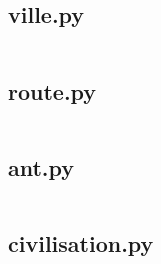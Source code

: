 \documentclass{rapportECL}
\begin{document}
\subsection{ville.py}

\inputminted{python}{scr/ville.py}

\subsection{route.py}

\inputminted{python}{scr/route.py}

\subsection{ant.py}

\inputminted{python}{scr/ant.py}

\subsection{civilisation.py}

\inputminted{python}{scr/civilisation.py}

\subsection{}

\inputminted{python}{scr/zoneaffichage.py}

\subsection{}

\inputminted{python}{scr/file_manager.py}

\subsection{}

\inputminted{python}{scr/test_colonie_fourmi.py}



\end{document}
